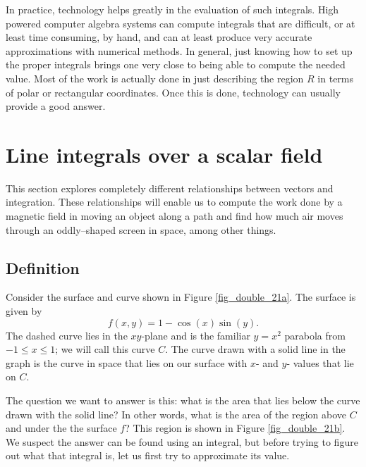 In practice, technology helps greatly in the evaluation of such integrals. High powered computer algebra systems can compute integrals that are difficult, or at least time consuming, by hand, and can at least produce very accurate approximations with numerical methods. In general, just knowing how to set up the proper integrals brings one very close to being able to compute the needed value. Most of the work is actually done in just describing the region $R$ in terms of polar or rectangular coordinates. Once this is done, technology can usually provide a good answer.


\section{Line integrals over a scalar field}\label{sec:line_int_intro}
This section explores completely different relationships between vectors and integration. These relationships will enable us to compute the work done by a magnetic field in moving an object along a path and find how much air moves through an oddly--shaped screen in space, among other things. 

\subsection{Definition}
Consider the surface and curve shown in Figure \ref{fig_double_21a}. The surface is given by $$f(x,y)=1-\cos(x)\sin(y).$$
The dashed curve lies in the $xy$-plane and is the familiar $y=x^2$ parabola from $-1\leq x\leq1$; we will call this curve $C$. The curve drawn with a solid line in the graph is the curve in space that lies on our surface with $x$- and $y$- values that lie on $C$. 

The question we want to answer is this: what is the area that lies below the curve drawn with the solid line? In other words, what is the area of the region above $C$ and under the the surface $f$? This region is shown in Figure \ref{fig_double_21b}. We suspect the answer can be found using an integral, but before trying to figure out what that integral is, let us first try to approximate its value. 


